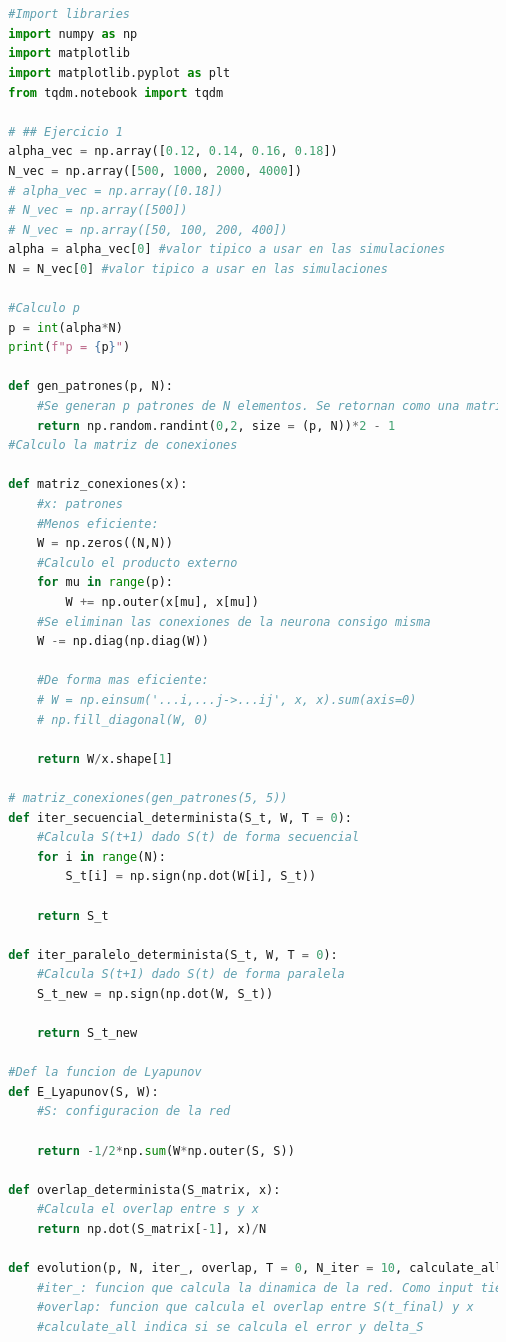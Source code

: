 \documentclass[aps,prb,twocolumn,superscriptaddress,floatfix,longbibliography]{revtex4-2}
\newcounter{para}
\begin{document}
\begin{lstlisting}[language=Python]
    

  #Import libraries
  import numpy as np
  import matplotlib
  import matplotlib.pyplot as plt
  from tqdm.notebook import tqdm
  
  # ## Ejercicio 1
  alpha_vec = np.array([0.12, 0.14, 0.16, 0.18])
  N_vec = np.array([500, 1000, 2000, 4000])
  # alpha_vec = np.array([0.18])
  # N_vec = np.array([500])
  # N_vec = np.array([50, 100, 200, 400])
  alpha = alpha_vec[0] #valor tipico a usar en las simulaciones
  N = N_vec[0] #valor tipico a usar en las simulaciones
  
  #Calculo p
  p = int(alpha*N)
  print(f"p = {p}")
  
  def gen_patrones(p, N):
      #Se generan p patrones de N elementos. Se retornan como una matriz
      return np.random.randint(0,2, size = (p, N))*2 - 1
  #Calculo la matriz de conexiones
  
  def matriz_conexiones(x):
      #x: patrones
      #Menos eficiente:
      W = np.zeros((N,N))
      #Calculo el producto externo
      for mu in range(p):
          W += np.outer(x[mu], x[mu])
      #Se eliminan las conexiones de la neurona consigo misma
      W -= np.diag(np.diag(W))
  
      #De forma mas eficiente:
      # W = np.einsum('...i,...j->...ij', x, x).sum(axis=0)
      # np.fill_diagonal(W, 0)
  
      return W/x.shape[1]
  
  # matriz_conexiones(gen_patrones(5, 5))
  def iter_secuencial_determinista(S_t, W, T = 0):
      #Calcula S(t+1) dado S(t) de forma secuencial
      for i in range(N):
          S_t[i] = np.sign(np.dot(W[i], S_t))
  
      return S_t
  
  def iter_paralelo_determinista(S_t, W, T = 0):
      #Calcula S(t+1) dado S(t) de forma paralela
      S_t_new = np.sign(np.dot(W, S_t))
  
      return S_t_new
  
  #Def la funcion de Lyapunov
  def E_Lyapunov(S, W):
      #S: configuracion de la red
  
      return -1/2*np.sum(W*np.outer(S, S))
  
  def overlap_determinista(S_matrix, x):
      #Calcula el overlap entre s y x
      return np.dot(S_matrix[-1], x)/N
  
  def evolution(p, N, iter_, overlap, T = 0, N_iter = 10, calculate_all = False):
      #iter_: funcion que calcula la dinamica de la red. Como input tiene S(t) y W
      #overlap: funcion que calcula el overlap entre S(t_final) y x
      #calculate_all indica si se calcula el error y delta_S
  

\end{lstlisting}
\end{document}
